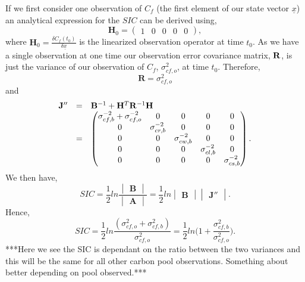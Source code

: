 \documentclass[11pt]{article}
\begin{document}
If we first consider one observation of $C_f$ (the first element of our state vector $\underline{x}$) an analytical expression for the $SIC$ can be derived using,
\[
\mathbf{H}_{0} = \begin{pmatrix}
1 & 0 & 0 & 0 & 0
\end{pmatrix},
\] 
where $\mathbf{H}_{0}=\frac{\delta C_f(t_0)}{\delta\underline{x}}$ is the linearized observation operator at time $t_0$. As we have a single observation at one time our observation error covariance matrix, $\bf{R}$, is just the variance of our observation of $C_f$, $\sigma_{cf,o}^{2}$, at time $t_0$. Therefore,
\[
\mathbf{R}=\sigma_{cf,o}^{2}
\]  
and
\[
\begin{array} {lcl}
\mathbf{J}'' &=& \mathbf{B}^{-1}+\mathbf{H}^{T}\mathbf{R}^{-1}\bf{H} \\
&=& \begin{pmatrix} 
\sigma_{cf,b}^{-2}+\sigma_{cf,o}^{-2} & 0 & 0 & 0 & 0 \\
0 & \sigma_{cr,b}^{-2} & 0 & 0 & 0 \\
0 & 0 & \sigma_{cw,b}^{-2} & 0 & 0 \\
0 & 0 & 0 & \sigma_{cl,b}^{-2} & 0 \\
0 & 0 & 0 & 0 & \sigma_{cs,b}^{-2} \\
\end{pmatrix}.
\end{array}
\] 
We then have,
\[
SIC=\frac{1}{2}ln\frac{\begin{vmatrix} \mathbf{B} \end{vmatrix}}{\begin{vmatrix} \mathbf{A} \end{vmatrix}} = \frac{1}{2}ln\begin{vmatrix} \mathbf{B} \end{vmatrix}\begin{vmatrix} \mathbf{J}'' \end{vmatrix}.
\]
Hence,
\[
SIC = \frac{1}{2}ln\frac{(\sigma_{cf,o}^{2}+\sigma_{cf,b}^{2})}{\sigma_{cf,o}^{2}}
=\frac{1}{2}ln \bigg(1+\frac{\sigma_{cf,b}^{2}}{\sigma_{cf,o}^{2}}\bigg).
\]
***Here we see the SIC is dependant on the ratio between the two variances and this will be the same for all other carbon pool observations. Something about better depending on pool observed.*** 
\end{document}

